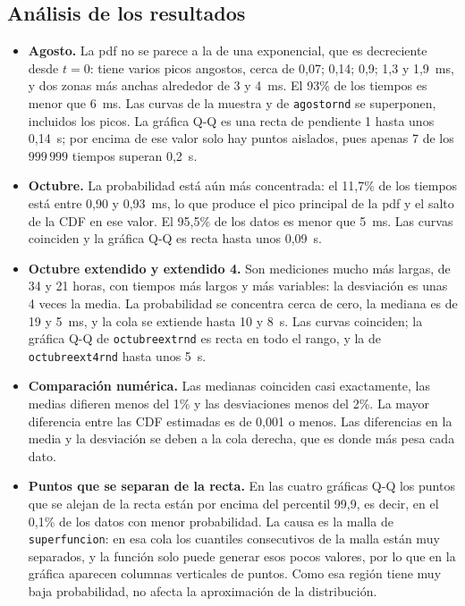 \documentclass[12pt]{article}
\begin{document}
\subsection{Análisis de los resultados}

\begin{itemize}
    \item \textbf{Agosto.} La pdf no se parece a la de una exponencial, que es decreciente desde $t=0$: tiene varios picos angostos, cerca de 0,07; 0,14; 0,9; 1,3 y 1,9~ms, y dos zonas más anchas alrededor de 3 y 4~ms. El 93\% de los tiempos es menor que 6~ms. Las curvas de la muestra y de \texttt{agostornd} se superponen, incluidos los picos. La gráfica Q-Q es una recta de pendiente 1 hasta unos 0,14~s; por encima de ese valor solo hay puntos aislados, pues apenas 7 de los $999\,999$ tiempos superan 0,2~s.
    \item \textbf{Octubre.} La probabilidad está aún más concentrada: el 11,7\% de los tiempos está entre 0,90 y 0,93~ms, lo que produce el pico principal de la pdf y el salto de la CDF en ese valor. El 95,5\% de los datos es menor que 5~ms. Las curvas coinciden y la gráfica Q-Q es recta hasta unos 0,09~s.
    \item \textbf{Octubre extendido y extendido 4.} Son mediciones mucho más largas, de 34 y 21 horas, con tiempos más largos y más variables: la desviación es unas 4 veces la media. La probabilidad se concentra cerca de cero, la mediana es de 19 y 5~ms, y la cola se extiende hasta 10 y 8~s. Las curvas coinciden; la gráfica Q-Q de \texttt{octubreextrnd} es recta en todo el rango, y la de \texttt{octubreext4rnd} hasta unos 5~s.
    \item \textbf{Comparación numérica.} Las medianas coinciden casi exactamente, las medias difieren menos del 1\% y las desviaciones menos del 2\%. La mayor diferencia entre las CDF estimadas es de 0,001 o menos. Las diferencias en la media y la desviación se deben a la cola derecha, que es donde más pesa cada dato.
    \item \textbf{Puntos que se separan de la recta.} En las cuatro gráficas Q-Q los puntos que se alejan de la recta están por encima del percentil 99,9, es decir, en el 0,1\% de los datos con menor probabilidad. La causa es la malla de \texttt{superfuncion}: en esa cola los cuantiles consecutivos de la malla están muy separados, y la función solo puede generar esos pocos valores, por lo que en la gráfica aparecen columnas verticales de puntos. Como esa región tiene muy baja probabilidad, no afecta la aproximación de la distribución.
\end{itemize}
\end{document}
